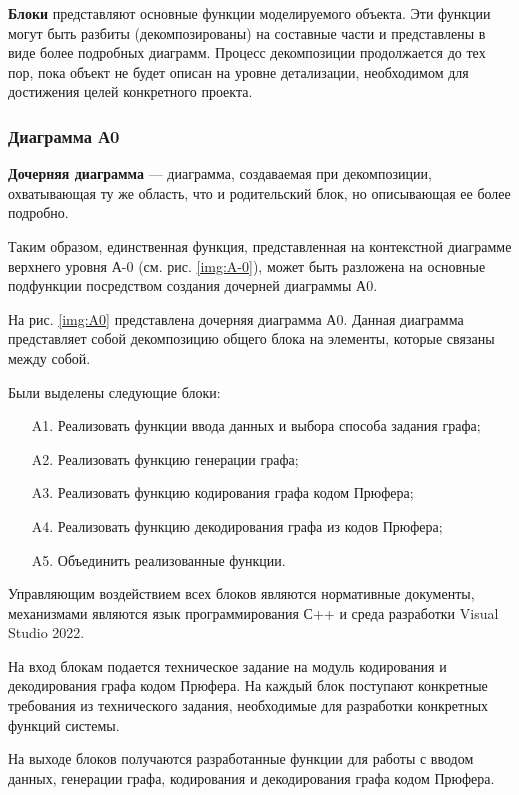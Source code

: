 \documentclass[a4paper, final]{article}
\begin{document}
{\bf Блоки} представляют основные функции моделируемого объекта. Эти функции могут быть разбиты (декомпозированы) 
на составные части и представлены в виде более подробных диаграмм. Процесс декомпозиции продолжается до тех пор, пока 
объект не будет описан на уровне детализации, необходимом для достижения целей конкретного проекта. 

\subsubsection{Диаграмма А0}
{\bf Дочерняя диаграмма} --- диаграмма, создаваемая при декомпозиции, охватывающая ту же область, что и родительский блок, 
но описывающая ее более подробно.

Таким образом, единственная функция, представленная на контекстной диаграмме верхнего уровня А-0 (см. рис. \ref{img:A-0}), 
может быть разложена на основные подфункции посредством создания дочерней диаграммы А0.

На рис. \ref{img:A0} представлена дочерняя диаграмма А0. Данная диаграмма представляет собой декомпозицию общего блока на 
элементы, которые связаны между собой.

Были выделены следующие блоки:

\begin{itemize}
	\item[A1.] Реализовать функции ввода данных и выбора способа задания графа;
	\item[A2.] Реализовать функцию генерации графа;
	\item[A3.] Реализовать функцию кодирования графа кодом Прюфера;
	\item[A4.] Реализовать функцию декодирования графа из кодов Прюфера;
	\item[A5.] Объединить реализованные функции.
\end{itemize} 

Управляющим воздействием всех блоков являются нормативные документы, механизмами являются язык программирования С++ 
и среда разработки Visual Studio 2022.

На вход блокам подается техническое задание на модуль кодирования и декодирования графа кодом Прюфера. На каждый 
блок поступают конкретные требования из технического задания, необходимые для разработки конкретных функций системы.

На выходе блоков получаются разработанные функции для работы с вводом данных, генерации графа, кодирования и декодирования
графа кодом Прюфера.
\end{document}
